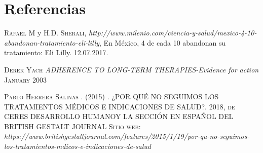 \section{Referencias}

\begin{thebibliography}{X}
	 \textsc{Rafael M} y \textsc{H.D. Sherali},
	\textit{http://www.milenio.com/ciencia-y-salud/mexico-4-10-abandonan-tratamiento-eli-lilly},  En México, 4 de cada 10 abandonan su tratamiento: Eli Lilly. 12.07.2017.
	
	 \textsc{Derek Yach} \textit{ADHERENCE TO LONG-TERM THERAPIES-Evidence for action
} \textsc{January 2003}
	
	 \textsc{Pablo Herrera Salinas . (2015)} \textsc{. ¿POR QUÉ NO SEGUIMOS LOS TRATAMIENTOS MÉDICOS E INDICACIONES DE SALUD?. 2018, de CERES DESARROLLO HUMANOY LA SECCIÓN EN ESPAÑOL DEL BRITISH GESTALT JOURNAL Sitio web:} \textit{https://www.britishgestaltjournal.com/features/2015/1/19/por-qu-no-seguimos-los-tratamientos-mdicos-e-indicaciones-de-salud}
	
	
	
\end{thebibliography}

%

